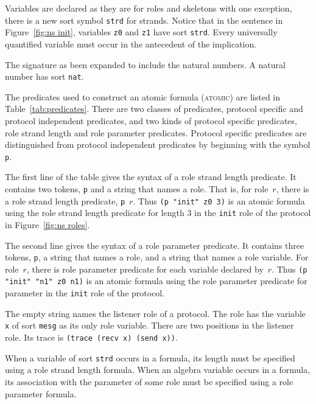 \documentclass[12pt]{article}
\newcommand{\sym}[1]{\textup{\texttt{#1}}}
\begin{document}
Variables are declared as they are for roles and skeletons with one
exception, there is a new sort symbol \sym{strd} for strands.  Notice
that in the sentence in Figure~\ref{fig:ns init}, variables \sym{z0}
and \sym{z1} have sort \sym{strd}.  Every universally quantified
variable must occur in the antecedent of the implication.

The signature as been expanded to include the natural numbers.  A
natural number has sort \sym{nat}.

The predicates used to construct an atomic formula (\textsc{atomic})
are listed in Table~\ref{tab:predicates}.  There are two classes of
predicates, protocol specific and protocol independent predicates, and
two kinds of protocol specific predicates, role strand length and role
parameter predicates.  Protocol specific predicates are distinguished
from protocol independent predicates by beginning with the symbol
\texttt{p}.

The first line of the table gives the syntax of a role strand length
predicate.  It contains two tokens, \texttt{p} and a string that names
a role.  That is, for role~$r$, there is a role strand length
predicate, \mbox{\texttt{p} $r$}.  Thus \verb|(p "init" z0 3)| is an
atomic formula using the role strand length predicate for length 3 in the
\texttt{init} role of the protocol in Figure~\ref{fig:ns roles}.

The second line gives the syntax of a role parameter predicate.  It
contains three tokens, \texttt{p}, a string that names a role, and a
string that names a role variable.  For role~$r$, there is role
parameter predicate for each variable declared by~$r$.  Thus
\verb|(p "init" "n1" z0 n1)| is an atomic formula using the role
parameter predicate for parameter  in the \texttt{init} role
of the protocol.

The empty string names the listener role of a protocol.  The role
has the variable \texttt{x} of sort \texttt{mesg} as its only role
variable.  There are two positions in the listener role.  Its trace is
\texttt{(trace (recv x) (send x))}.

When a variable of sort \sym{strd} occurs in a formula, its length
must be specified using a role strand length formula.  When an algebra
variable occurs in a formula, its association with the parameter of
some role must be specified using a role parameter formula.
\end{document}

